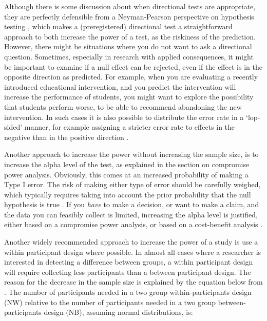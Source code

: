 \documentclass[
  oneside]{krantz}
\begin{document}
Although there is some discussion about when directional tests are appropriate, they are perfectly defensible from a Neyman-Pearson perspective on hypothesis testing \citep{cho_is_2013}, which makes a (preregistered) directional test a straightforward approach to both increase the power of a test, as the riskiness of the prediction. However, there might be situations where you do not want to ask a directional question. Sometimes, especially in research with applied consequences, it might be important to examine if a null effect can be rejected, even if the effect is in the opposite direction as predicted. For example, when you are evaluating a recently introduced educational intervention, and you predict the intervention will increase the performance of students, you might want to explore the possibility that students perform worse, to be able to recommend abandoning the new intervention. In such cases it is also possible to distribute the error rate in a `lop-sided' manner, for example assigning a stricter error rate to effects in the negative than in the positive direction \citep{rice_heads_1994}.

Another approach to increase the power without increasing the sample size, is to increase the alpha level of the test, as explained in the section on compromise power analysis. Obviously, this comes at an increased probability of making a Type I error. The risk of making either type of error should be carefully weighed, which typically requires taking into account the prior probability that the null hypothesis is true \citep{cascio_open_1983, mudge_setting_2012, murphy_statistical_2014, miller_quest_2019}. If you \emph{have} to make a decision, or want to make a claim, and the data you can feasibly collect is limited, increasing the alpha level is justified, either based on a compromise power analysis, or based on a cost-benefit analysis \citep{field_minimizing_2004, baguley_understanding_2004}.

Another widely recommended approach to increase the power of a study is use a within participant design where possible. In almost all cases where a researcher is interested in detecting a difference between groups, a within participant design will require collecting less participants than a between participant design. The reason for the decrease in the sample size is explained by the equation below from \citet{maxwell_designing_2017}. The number of participants needed in a two group within-participants design (NW) relative to the number of participants needed in a two group between-participants design (NB), assuming normal distributions, is:
\end{document}
